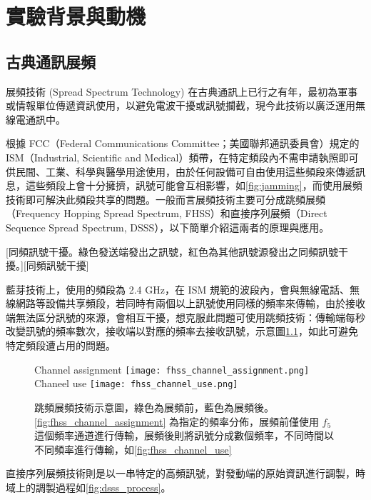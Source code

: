 \documentclass[class=NCU_thesis, crop=false]{standalone}
\begin{document}
\chapter{實驗背景與動機}
\section{古典通訊展頻}
展頻技術 (Spread Spectrum Technology) 在古典通訊上已行之有年，最初為軍事或情報單位傳遞資訊使用，以避免電波干擾或訊號攔截，現今此技術以廣泛運用無線電通訊中。

根據 FCC（Federal Communications Committee；美國聯邦通訊委員會）規定的 ISM（Industrial, Scientific and Medical）頻帶，在特定頻段內不需申請執照即可供民間、工業、科學與醫學用途使用，由於任何設備可自由使用這些頻段來傳遞訊息，這些頻段上會十分擁擠，訊號可能會互相影響，如\cref{fig:jamming}，而使用展頻技術即可解決此頻段共享的問題。一般而言展頻技術主要可分成跳頻展頻（Frequency Hopping Spread Spectrum, FHSS）和直接序列展頻（Direct Sequence Spread Spectrum, DSSS），以下簡單介紹這兩者的原理與應用。


[同頻訊號干擾。綠色發送端發出之訊號，紅色為其他訊號源發出之同頻訊號干擾。][同頻訊號干擾]

藍芽技術上，使用的頻段為 2.4 GHz，在 ISM 規範的波段內，會與無線電話、無線網路等設備共享頻段，若同時有兩個以上訊號使用同樣的頻率來傳輸，由於接收端無法區分訊號的來源，會相互干擾，想克服此問題可使用跳頻技術：傳輸端每秒改變訊號的頻率數次，接收端以對應的頻率去接收訊號，示意圖\cref{fig:fhss}，如此可避免特定頻段遭占用的問題。

\begin{figure}[!hbt]
    \centering
    \subcaptionbox
        {Channel assignment
        \label{fig:fhss_channel_assignment}}
        {\texttt{[image: fhss\_channel\_assignment.png]}}
    ~~~~
    \subcaptionbox
        {Chaneel use
        \label{fig:fhss_channel_use}}
        {\texttt{[image: fhss\_channel\_use.png]}}
    \caption[跳頻展頻技術示意圖]{跳頻展頻技術示意圖，綠色為展頻前，藍色為展頻後。\cref{fig:fhss_channel_assignment} 為指定的頻率分佈，展頻前僅使用 $f_5$ 這個頻率通道進行傳輸，展頻後則將訊號分成數個頻率，不同時間以不同頻率進行傳輸，如\cref{fig:fhss_channel_use}}
    \label{fig:fhss}
\end{figure}

直接序列展頻技術則是以一串特定的高頻訊號，對發動端的原始資訊進行調製，時域上的調製過程如\cref{fig:dsss_process}。
\end{document}
